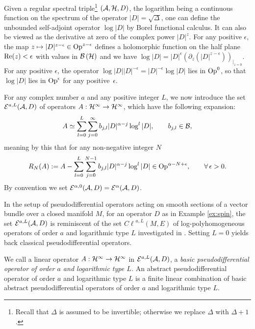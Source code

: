 \documentclass[pdftex]{sigma}
\def \e {{\epsilon}}
\def \Cl {{C\ell}}
\numberwithin{equation}{section}
\begin{document}
Given a regular spectral triple\footnote{Recall that $\Delta$ is assumed to be
  invertible; otherwise we replace $\Delta$ with $\Delta+1$.}
$({\cal A}, {\cal H}, D)$,    the logarithm being a continuous
  function on the spectrum of the
operator
$\vert D\vert=\sqrt{\Delta}$,  one can
def\/ine the
unbounded self-adjoint operator $\log \vert D\vert$ by Borel functional
 calculus. It can  also be viewed as
the derivative at zero of the complex power $\vert D\vert^z$.  For any positive $\e$, the map  $z\mapsto \vert D\vert^{z-\e}\in {\rm Op}^{z-\e}$
 def\/ines a holomorphic  function on the half plane ${\rm Re}(z)<\e$ with
values  in ${\cal B}\left({\cal H}\right)$ and we have
$\log \vert D\vert =\vert D\vert^{\e}
 \left(\partial_z \left( \vert D\vert^{z-\e}\right)\right)_{\vert_{z=0}}
 $.
For any positive $\e$, the operator $ \log \vert D\vert   \vert D\vert^{-\e}=
\vert D\vert^{-\e}  \log \vert D\vert$ lies in   ${\rm Op}^0$, so that   $\log
\vert D\vert$ lies  in ${\rm Op}^\e$ for any positive~$\e$.


 For any complex number $a$ and any positive integer $L$,  we now introduce
 the set
${\cal E}^{a, L}({\cal A}, D) $   of
operators $A:{\cal H}^\infty\to {\cal H}^\infty$, which have the following expansion:
\[
A\simeq \sum_{l=0}^L\sum_{j=0}^\infty b_{j,l} \vert D\vert^{\alpha-j}  \log^l \vert D\vert, \qquad b_{j, l}\in {\cal
  B},
  \]
   meaning by this that for any non-negative integer $N$
\[
R_N(A):=A-\sum_{l=0}^L\sum_{j=0}^{N-1}  b_{j,l} \vert D\vert^{\alpha-j}  \log^l \vert D\vert  \in {\rm  Op}^{\alpha -N+\e}, \qquad\forall \,  \e>0.
\]
By convention we set  ${\cal E}^{\alpha, 0}({\cal A}, D)=
 {\cal E}^\alpha({\cal A}, D)$.

 \begin{remark} In the setup of pseudodif\/ferential
 operators acting on smooth sections of a vector bundle over a closed manifold
 $M$, for an operator $D$ as in Example \ref{ex:spin}, the set ${\cal E}^{a,
 L}({\cal A}, D)$ is reminiscent of the set $\Cl^{a,L}(M,E)$ of
 log-polyhomogeneous operators of order $a$ and logarithmic type $L$
 investigated in \cite{L}. Setting $L=0$ yields back classical
 pseudodif\/ferential operators.
 \end{remark}
We call  a linear operator $A: {\cal
   H}^\infty \to {\cal H}^\infty$ in ${\cal E}^{a, L}({\cal A}, D)$,  a {\it   basic    pseudodif\/ferential
   opera\-tor of order
 $a$ and   logarithmic  type $L$.} An abstract pseudodif\/ferential operator of
 order $a$ and logarithmic type $L$ is a f\/inite linear combination of basic
 abstract pseudodif\/ferential operators of order $a$ and logarithmic type $L$.
\end{document}
